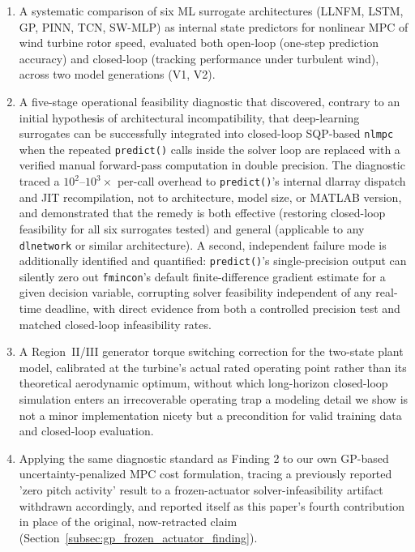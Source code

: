 \begin{enumerate}
\item A systematic comparison of six ML surrogate architectures (LLNFM,
LSTM, GP, PINN, TCN, SW-MLP) as internal state predictors for nonlinear
MPC of wind turbine rotor speed, evaluated both open-loop (one-step
prediction accuracy) and closed-loop (tracking performance under
turbulent wind), across two model generations (V1, V2).
\item A five-stage operational feasibility diagnostic that discovered,
contrary to an initial hypothesis of architectural incompatibility,
that deep-learning surrogates can be successfully integrated into
closed-loop SQP-based \texttt{nlmpc} when the repeated \texttt{predict()}
calls inside the solver loop are replaced with a verified manual
forward-pass computation in double precision. The diagnostic traced a
$10^{2}$--$10^{3}\times$ per-call overhead to \texttt{predict()}'s
internal dlarray dispatch and JIT recompilation, not to architecture,
model size, or MATLAB version, and demonstrated that the remedy is
both effective (restoring closed-loop feasibility for all six
surrogates tested) and general (applicable to any \texttt{dlnetwork} or
similar architecture). A second, independent failure mode is
additionally identified and quantified: \texttt{predict()}'s
single-precision output can silently zero out \texttt{fmincon}'s
default finite-difference gradient estimate for a given decision
variable, corrupting solver feasibility independent of any real-time
deadline, with direct evidence from both a controlled precision test
and matched closed-loop infeasibility rates.
\item A Region~II/III generator torque switching correction for the
two-state plant model, calibrated at the turbine's actual rated operating
point rather than its theoretical aerodynamic optimum, without which
long-horizon closed-loop simulation enters an irrecoverable operating
trap a modeling detail we show is not a minor implementation nicety but
a precondition for valid training data and closed-loop evaluation.
\item Applying the same diagnostic standard as Finding 2 to our own
GP-based uncertainty-penalized MPC cost formulation, tracing a
previously reported 'zero pitch activity' result to a frozen-actuator
solver-infeasibility artifact  withdrawn accordingly, and reported
itself as this paper's fourth contribution in place of the original,
now-retracted claim
(Section~\ref{subsec:gp_frozen_actuator_finding}).
\end{enumerate}


